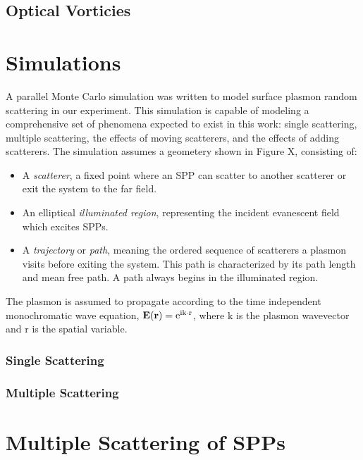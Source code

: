 \documentclass[a4paper,titlepage,onecolumn]{report}
\begin{document}
\section{Optical Vorticies}


\chapter{Simulations}
A parallel Monte Carlo simulation was written to model surface plasmon
random scattering in our experiment. This simulation is capable of modeling
a comprehensive set of phenomena expected to exist in this work: single
scattering, multiple scattering, the effects of moving scatterers, and the
effects of adding scatterers. The simulation assumes a geometery shown in
Figure X, consisting of:

\begin{itemize}

\item A \textit{scatterer}, a fixed point where an SPP can scatter to
another scatterer or exit the system to the far field.

\item An elliptical \textit{illuminated region}, representing the incident
evanescent field which excites SPPs.

\item A \textit{trajectory} or \textit{path}, meaning the ordered sequence
of scatterers a plasmon visits before exiting the system. This path is
characterized by its path length and mean free path. A path always begins
in the illuminated region.

\end{itemize}

The plasmon is assumed to propagate according to the time independent
monochromatic wave equation, $\mathbf{E}(\mathbf{r})={\mathrm{e}}^{{\mathrm{i}}
\mathrm{k}\cdot \mathrm{r}}$, where $\mathrm{k}$ is the plasmon wavevector
and $\mathrm{r}$ is the spatial variable.

\subsection{Single Scattering}

\subsection{Multiple Scattering}
 

\chapter{Multiple Scattering of SPPs}
\end{document}

